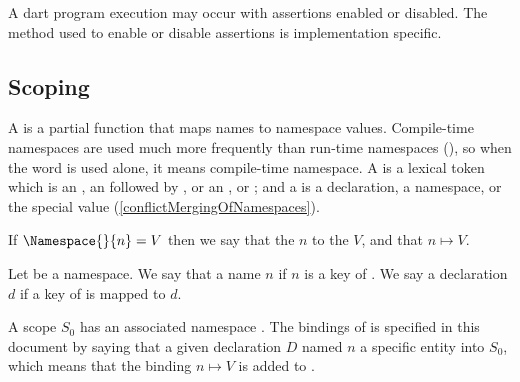 \documentclass[makeidx]{article}
\begin{document}

\LMHash{}%
A dart program execution may occur with assertions enabled or disabled.
The method used to enable or disable assertions is implementation specific.


\subsection{Scoping}

\LMHash{}%
A 
is a partial function that maps names to namespace values.
Compile-time namespaces are used much more frequently than run-time namespaces
(),
so when the word  is used alone,
it means compile-time namespace.
A  is a lexical token which is an ,
an  followed by \lit{=}, or
an ,
or ;
and a  is
a declaration, a namespace, or the special value \ConflictValue{}
(\ref{conflictMergingOfNamespaces}).

\LMHash{}%
If $\Namespace{}{n} = V$ then we say that \NamespaceName{}
the
$n$ to the
$V$,
and that \NamespaceName{}
$n\mapsto{}V$.

\LMHash{}%
Let \NamespaceName{} be a namespace.
We say that a name $n$  \NamespaceName{}
if $n$ is a key of \NamespaceName.
We say a declaration $d$  \NamespaceName{}
if a key of \NamespaceName{} is mapped to $d$.

\LMHash{}%
A scope $S_0$ has an associated namespace .
The bindings of  is specified in this document by saying that
a given declaration $D$ named $n$
a specific entity  into $S_0$,
which means that the binding $n\mapsto{}V$ is added to .
\end{document}
